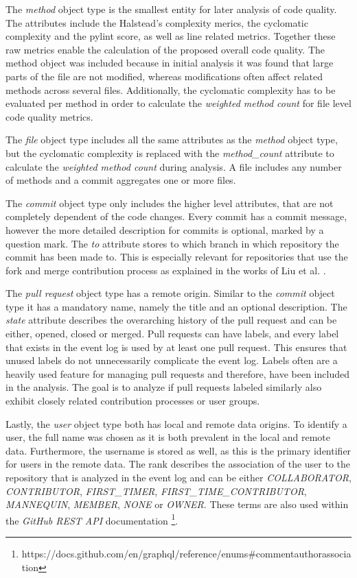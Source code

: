 The \emph{method} object type is the smallest entity for later analysis of code quality. The attributes include the Halstead's complexity merics, the cyclomatic complexity and the pylint score, as well as line related metrics. Together these raw metrics enable the calculation of the proposed overall code quality. The method object was included because in initial analysis it was found that large parts of the file are not modified, whereas modifications often affect related methods across several files. Additionally, the cyclomatic complexity has to be evaluated per method in order to calculate the \emph{weighted method count} for file level code quality metrics.

The \emph{file} object type includes all the same attributes as the \emph{method} object type, but the cyclomatic complexity is replaced with the \emph{method\_count} attribute to calculate the \emph{weighted method count} during analysis. A file includes any number of methods and a commit aggregates one or more files.

The \emph{commit} object type only includes the higher level attributes, that are not completely dependent of the code changes. Every commit has a commit message, however the more detailed description for commits is optional, marked by a question mark. The \emph{to} attribute stores to which branch in which repository the commit has been made to. This is especially relevant for repositories that use the fork and merge contribution process as explained in the works of Liu et al. \autocite{DBLP:conf/icse/Liu0MKYXGG24}.

The \emph{pull request} object type has a remote origin. Similar to the \emph{commit} object type it has a mandatory name, namely the title and an optional description. The \emph{state} attribute describes the overarching history of the pull request and can be either, opened, closed or merged. Pull requests can have labels, and every label that exists in the event log is used by at least one pull request. This ensures that unused labels do not unnecessarily complicate the event log. Labels often are a heavily used feature for managing pull requests and therefore, have been included in the analysis. The goal is to analyze if pull requests labeled similarly also exhibit closely related contribution processes or user groups.  

Lastly, the \emph{user} object type both has local and remote data origins. To identify a user, the full name was chosen as it is both prevalent in the local and remote data. Furthermore, the username is stored as well, as this is the primary identifier for users in the remote data. The rank describes the association of the user to the repository that is analyzed in the event log and can be either \emph{COLLABORATOR}, \emph{CONTRIBUTOR}, \emph{FIRST\_TIMER}, \emph{FIRST\_TIME\_CONTRIBUTOR}, \emph{MANNEQUIN}, \emph{MEMBER}, \emph{NONE} or \emph{OWNER}. These terms are also used within the \emph{GitHub REST API} documentation \footnote{https://docs.github.com/en/graphql/reference/enums\#commentauthorassociation}.

